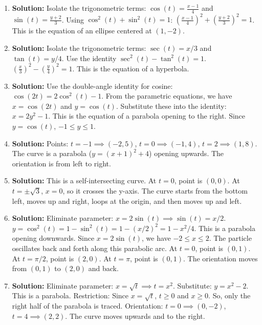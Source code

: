 \documentclass{article}
\begin{document}
\begin{enumerate}
\item \textbf{Solution:} Isolate the trigonometric terms: $\cos(t) = \frac{x-1}{4}$ and $\sin(t) = \frac{y+2}{3}$.
Using $\cos^2(t) + \sin^2(t) = 1$:
$\left(\frac{x-1}{4}\right)^2 + \left(\frac{y+2}{3}\right)^2 = 1$.
This is the equation of an ellipse centered at $(1, -2)$.

\item \textbf{Solution:} Isolate the trigonometric terms: $\sec(t) = x/3$ and $\tan(t) = y/4$.
Use the identity $\sec^2(t) - \tan^2(t) = 1$.
$\left(\frac{x}{3}\right)^2 - \left(\frac{y}{4}\right)^2 = 1$.
This is the equation of a hyperbola.

\item \textbf{Solution:} Use the double-angle identity for cosine: $\cos(2t) = 2\cos^2(t) - 1$.
From the parametric equations, we have $x = \cos(2t)$ and $y = \cos(t)$.
Substitute these into the identity: $x = 2y^2 - 1$.
This is the equation of a parabola opening to the right. Since $y=\cos(t)$, $-1 \le y \le 1$.

\item \textbf{Solution:} Points: $t=-1 \implies (-2, 5)$, $t=0 \implies (-1, 4)$, $t=2 \implies (1, 8)$. The curve is a parabola ($y = (x+1)^2+4$) opening upwards. The orientation is from left to right.

\item \textbf{Solution:} This is a self-intersecting curve. At $t=0$, point is $(0,0)$. At $t=\pm\sqrt{3}$, $x=0$, so it crosses the y-axis. The curve starts from the bottom left, moves up and right, loops at the origin, and then moves up and left.

\item \textbf{Solution:} Eliminate parameter: $x = 2\sin(t) \implies \sin(t) = x/2$. $y = \cos^2(t) = 1-\sin^2(t) = 1-(x/2)^2 = 1-x^2/4$. This is a parabola opening downwards. Since $x=2\sin(t)$, we have $-2 \le x \le 2$. The particle oscillates back and forth along this parabolic arc. At $t=0$, point is $(0,1)$. At $t=\pi/2$, point is $(2,0)$. At $t=\pi$, point is $(0,1)$. The orientation moves from $(0,1)$ to $(2,0)$ and back.

\item \textbf{Solution:} Eliminate parameter: $x=\sqrt{t} \implies t=x^2$. Substitute: $y=x^2-2$. This is a parabola.
Restriction: Since $x=\sqrt{t}$, $t \ge 0$ and $x \ge 0$. So, only the right half of the parabola is traced.
Orientation: $t=0 \implies (0, -2)$, $t=4 \implies (2, 2)$. The curve moves upwards and to the right.


\end{enumerate}
\end{document}
